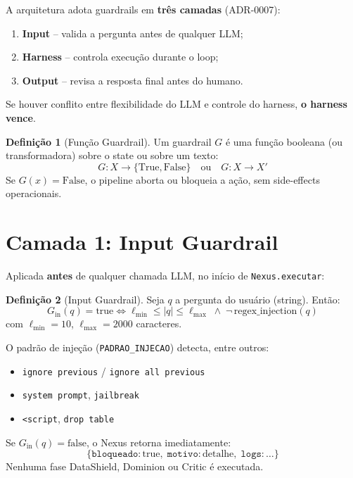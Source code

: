 \documentclass[a4paper, 12pt]{report}
\theoremstyle{definition}
\newtheorem{definicao}{Defini\c{c}\~ao}[chapter]
\theoremstyle{remark}
\begin{document}
\begin{caixadecisao}
  A arquitetura adota guardrails em \textbf{tr\^es camadas} (ADR-0007):
  \begin{enumerate}
    \item \textbf{Input} -- valida a pergunta antes de qualquer LLM;
    \item \textbf{Harness} -- controla execu\c{c}\~ao durante o loop;
    \item \textbf{Output} -- revisa a resposta final antes do humano.
  \end{enumerate}
  Se houver conflito entre flexibilidade do LLM e controle do harness,
  \textbf{o harness vence}.
\end{caixadecisao}

\begin{definicao}[Fun\c{c}\~ao Guardrail]
  Um guardrail $G$ \'e uma fun\c{c}\~ao booleana (ou transformadora) sobre
  o state ou sobre um texto:
  \[
    G : X \to \{\text{True}, \text{False}\}
    \quad \text{ou} \quad
    G : X \to X'
  \]
  Se $G(x) = \text{False}$, o pipeline aborta ou bloqueia a a\c{c}\~ao,
  sem side-effects operacionais.
\end{definicao}


\section{Camada 1: Input Guardrail}

Aplicada \textbf{antes} de qualquer chamada LLM, no in\'icio de
\texttt{Nexus.executar}:

\begin{definicao}[Input Guardrail]
  Seja $q$ a pergunta do usu\'ario (string). Ent\~ao:
  \[
    G_{\text{in}}(q) = \text{true} \iff
    \ell_{\min} \leq |q| \leq \ell_{\max}
    \;\land\;
    \neg\,\text{regex\_injection}(q)
  \]
  com $\ell_{\min} = 10$, $\ell_{\max} = 2000$ caracteres.
\end{definicao}

O padr\~ao de inje\c{c}\~ao (\texttt{PADRAO\_INJECAO}) detecta, entre outros:
\begin{itemize}
  \item \texttt{ignore previous} / \texttt{ignore all previous}
  \item \texttt{system prompt}, \texttt{jailbreak}
  \item \texttt{<script}, \texttt{drop table}
\end{itemize}

\begin{caixaguardrail}
  Se $G_{\text{in}}(q) = \text{false}$, o Nexus retorna imediatamente:
  \[
    \{\texttt{bloqueado}: \text{true},\;
      \texttt{motivo}: \text{detalhe},\;
      \texttt{logs}: \ldots\}
  \]
  Nenhuma fase DataShield, Dominion ou Critic \'e executada.
\end{caixaguardrail}
\end{document}
